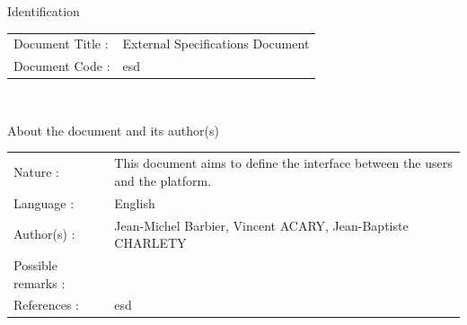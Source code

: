 \begin{center}
  \textsf{\Large Identification}
\end{center}

\noindent\begin{tabular}{|p{}|p{}|}
\hline
Document Title : & \textsf{External Specifications Document} \\
Document Code :  & \textsf{\acs{esd}} \\
\hline
\end{tabular}
\textsf{ }\\


\begin{center}
  \textsf{\Large About the document and its author(s)}
\end{center}

\noindent\begin{tabular}{|p{}|p{}|}
\hline
Nature :& \textsf{This document aims to define the interface between the users and the platform.}\\
Language :& \textsf{English}\\
Author(s) :& \textsf{Jean-Michel Barbier, Vincent ACARY, Jean-Baptiste CHARLETY}\\
Possible remarks :& \textsf{}\\
References : &\textsf{\acs{esd}}\\
\hline
\end{tabular}

\textsf{ }\\



